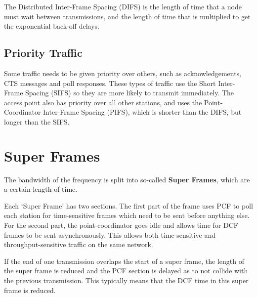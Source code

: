 The Distributed Inter-Frame Spacing (DIFS) is the length of time that a node must wait between transmissions, and the
 length of time that is multiplied to get the exponential back-off delays.

\subsection*{Priority Traffic}

Some traffic needs to be given priority over others, such as acknowledgements, CTS messages and poll responses. These
 types of traffic use the Short Inter-Frame Spacing (SIFS) so they are more likely to transmit immediately. The access
 point also has priority over all other stations, and uses the Point-Coordinator Inter-Frame Spacing (PIFS), which is
 shorter than the DIFS, but longer than the SIFS.

\section*{Super Frames}

The bandwidth of the frequency is split into so-called \textbf{Super Frames}, which are a certain length of time.

Each `Super Frame' has two sections. The first part of the frame uses PCF to poll each station for time-sensitive frames
 which need to be sent before anything else. For the second part, the point-coordinator goes idle and allows time for
 DCF frames to be sent asynchronously. This allows both time-sensitive and throughput-sensitive traffic on the same
 network.

If the end of one transmission overlaps the start of a super frame, the length of the super frame is reduced and the
 PCF section is delayed as to not collide with the previous transmission. This typically means that the DCF time in this
 super frame is reduced.